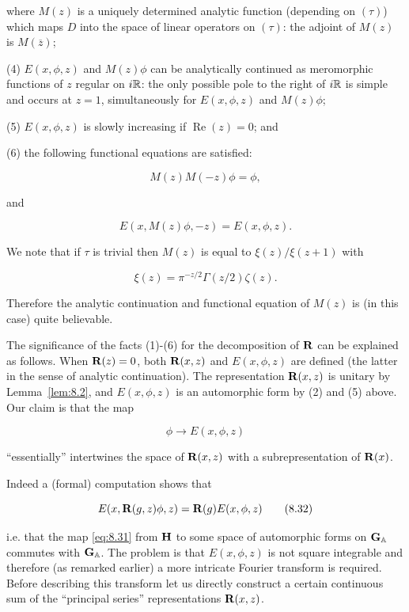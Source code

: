 where $M(z)$ is a uniquely determined analytic function (depending on $(\tau)$) which maps $D$ into the space of linear operators on $(\tau)$: the adjoint of $M(z)$ is $M(\overline{z})$;

(4) $E(x,\phi,z)$ and $M(z)\phi$ can be analytically continued as meromorphic functions of $z$ regular on $i\mathbb{R}$: the only possible pole to the right of $i\mathbb{R}$ is simple and occurs at $z = 1$, simultaneously for $E(x,\phi,z)$ and $M(z)\phi$;

(5) $E(x,\phi,z)$ is slowly increasing if $\operatorname{Re}(z) = 0$; and

(6) the following functional equations are satisfied:

\begin{equation}\label{eq:8.29}
M(z)M(-z)\phi = \phi,\tag{8.29}
\end{equation}

and

\begin{equation}\label{eq:8.30}
E(x,M(z)\phi,-z) = E(x,\phi,z).\tag{8.30}
\end{equation}

We note that if $\tau$ is trivial then $M(z)$ is equal to $\xi(z)/\xi(z+1)$ with

\[
\xi(z) = \pi^{-z/2}\Gamma(z/2)\zeta(z).
\]

Therefore the analytic continuation and functional equation of $M(z)$ is (in this case) quite believable.

The significance of the facts (1)-(6) for the decomposition of $\mathbf{R}$ can be explained as follows. When $\mathbf{R}(z) = 0$, both $\mathbf{R}(x,z)$ and $E(x,\phi,z)$ are defined (the latter in the sense of analytic continuation). The representation $\mathbf{R}(x,z)$ is unitary by Lemma~\ref{lem:8.2}, and $E(x,\phi,z)$ is an automorphic form by (2) and (5) above. Our claim is that the map

\begin{equation}\label{eq:8.31}
\phi \to E(x,\phi,z)\tag{8.31}
\end{equation}

``essentially'' intertwines the space of $\mathbf{R}(x,z)$ with a subrepresentation of $\mathbf{R}(x)$.

Indeed a (formal) computation shows that

\begin{equation}\label{eq:8.32}
E(x,\mathbf{R}(g,z)\phi,z) = \mathbf{R}(g)E(x,\phi,z)\tag{8.32}
\end{equation}

i.e. that the map \eqref{eq:8.31} from $\mathbf{H}$ to some space of automorphic forms on $\mathbf{G}_{\mathbb{A}}$ commutes with $\mathbf{G}_{\mathbb{A}}$. The problem is that $E(x,\phi,z)$ is not square integrable and therefore (as remarked earlier) a more intricate Fourier transform is required. Before describing this transform let us directly construct a certain continuous sum of the ``principal series'' representations $\mathbf{R}(x,z)$.

